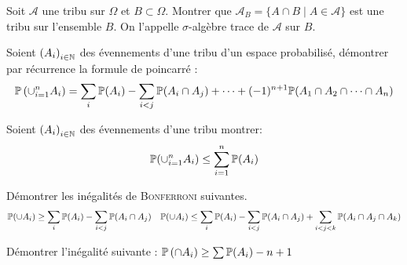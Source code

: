 \documentclass{report}
\begin{document}
\begin{exo}
    Soit \(\mathcal{A}\) une tribu sur \(\Omega\) et \(B\subset\Omega\). Montrer que
    \(\mathcal{A}_B=\{A\cap B\mid A\in\mathcal{A}\}\) est une tribu sur
    l'ensemble \(B\). On l'appelle \(\sigma\)-algèbre trace de \(\mathcal{A}\) sur \(B\).
\end{exo}

\begin{exo}
    Soient \(\left(A_i\right)_{i\in\mathbb{N}}\) des évennements d'une tribu d'un espace
    probabilisé, démontrer par récurrence la formule de poincarré :
    \[\mathbb{P}\left(\cup_{i=1}^nA_i\right)=\sum_i\mathbb{P}(A_i)-\sum_{i<j}\mathbb{P}(A_i\cap A_j)
    + \dots + (-1)^{n+1}\mathbb{P}(A_1\cap A_2 \cap\dots\cap A_n)\]
\end{exo}

\begin{exo}
    Soient \(\left(A_i\right)_{i\in\mathbb{N}}\) des évennements d'une tribu montrer:
    \[ \mathbb{P}(\cup_{i=1}^nA_i)\leq \sum_{i=1}^n\mathbb{P}(A_i)\]
\end{exo}

\begin{exo}
    Démontrer les inégalités de \textsc{Bonferroni} suivantes.
    \[\mathbb{P}(\cup A_i)\geq \sum_i \mathbb{P}(A_i)-\sum_{i<j}\mathbb{P}(A_i\cap A_j)\quad
    \mathbb{P}(\cup A_i)\leq\sum_i \mathbb{P}(A_i)-\sum_{i<j}\mathbb{P}(A_i\cap A_j)+
    \sum_{i<j<k}\mathbb{P}(A_i\cap A_j\cap A_k)\]
\end{exo}

\begin{exo}
    Démontrer l'inégalité suivante : \(\mathbb{P}\left(\cap A_i\right)\geq\sum\mathbb{P}(A_i)-n+1\)
\end{exo}
\end{document}

